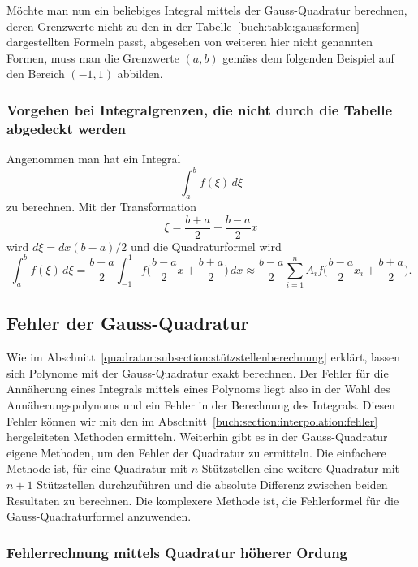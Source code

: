 Möchte man nun ein beliebiges Integral mittels der Gauss-Quadratur berechnen,
deren Grenzwerte nicht zu den in der Tabelle~\ref{buch:table:gaussformen} 
dargestellten Formeln passt, 
abgesehen von weiteren hier nicht genannten Formen, 
muss man die Grenzwerte $(a, b)$ gemäss dem folgenden Beispiel
auf den Bereich $(-1, 1)$ abbilden.

\subsubsection{Vorgehen bei Integralgrenzen, die nicht durch die Tabelle abgedeckt werden}

Angenommen man hat ein Integral
\begin{equation}
    \int_{a}^{b}f(\xi)\,d\xi
\end{equation}
zu berechnen.
Mit der Transformation
\begin{equation}
    \xi = \frac{b + a}{2} + \frac{b - a}{2} x    
\end{equation}
wird $d\xi = dx(b - a)/2$ und die Quadraturformel wird
\begin{equation}
    \int_{a}^{b}f(\xi)\,d\xi 
    =
    \frac{b - a}{2} \int_{-1}^{1}f\bigg(\frac{b - a}{2}x + \frac{b + a}{2}\bigg)\, dx 
    \approx
     \frac{b - a}{2} \sum_{i=1}^{n} A_{i}f\bigg(\frac{b - a}{2}x_{i} + \frac{b + a}{2}\bigg).
\end{equation}

\subsection{Fehler der Gauss-Quadratur
\label{quadratur:subsection:gaussfehler}}
Wie im Abschnitt~\ref{quadratur:subsection:stützstellenberechnung} erklärt,
lassen sich Polynome mit der Gauss-Quadratur exakt berechnen. 
Der Fehler für die Annäherung eines Integrals mittels eines Polynoms liegt
also in der Wahl des Annäherungspolynoms und ein Fehler in der Berechnung des Integrals.
Diesen Fehler können wir mit den im Abschnitt~\ref{buch:section:interpolation:fehler}
hergeleiteten Methoden ermitteln.
Weiterhin gibt es in der Gauss-Quadratur eigene Methoden, 
um den Fehler der Quadratur zu ermitteln. 
Die einfachere Methode ist, für eine Quadratur mit $n$ Stützstellen eine weitere
Quadratur mit $n+1$ Stützstellen durchzuführen und die absolute Differenz
zwischen beiden Resultaten zu berechnen. 
Die komplexere Methode ist, 
die Fehlerformel für die Gauss-Quadraturformel anzuwenden. 
%

\subsubsection{Fehlerrechnung mittels Quadratur höherer Ordung}

